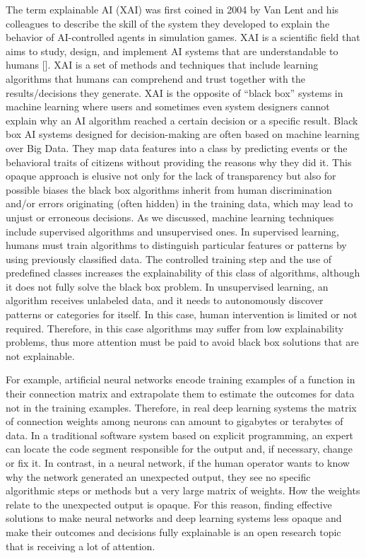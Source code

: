 The term explainable AI (XAI) was first coined in 2004 by Van Lent and his colleagues to describe the skill of the system they developed to explain the behavior of AI-controlled agents in simulation games. XAI is a scientific field that aims to study, design, and implement AI systems that are understandable to humans [\citealt{chap:10:AdadiandBerrada:2018}]. XAI is a set of methods and techniques that include learning algorithms that humans can comprehend and trust together with the results/{\allowbreak}decisions they generate. XAI is the opposite of ``black box'' systems in machine learning where users and sometimes even system designers cannot explain why an AI algorithm reached a certain decision or a specific result. Black box AI systems designed for decision-making are often based on machine learning over Big Data. They map data features into a class by predicting events or the behavioral traits of citizens without providing the reasons why they did it. This opaque approach is elusive not only for the lack of transparency but also for possible biases the black box algorithms inherit from human discrimination and/or errors originating (often hidden) in the training data, which may lead to unjust or erroneous decisions. As we discussed, machine learning techniques include supervised algorithms and unsupervised ones. In supervised learning, humans must train algorithms to distinguish particular features or patterns by using previously classified data. The controlled training step and the use of predefined classes increases the explainability of this class of algorithms, although it does not fully solve the black box problem. In unsupervised learning, an algorithm receives unlabeled data, and it needs to autonomously discover patterns or categories for itself. In this case, human intervention is limited or not required. Therefore, in this case algorithms may suffer from low explainability problems, thus more attention must be paid to avoid black box solutions that are not explainable.

For example, artificial neural networks encode training examples of a function in their connection matrix and extrapolate them to estimate the outcomes for data not in the training examples. Therefore, in real deep learning systems the matrix of connection weights among neurons can amount to gigabytes or terabytes of data. In a traditional software system based on explicit programming, an expert can locate the code segment responsible for the output and, if necessary, change or fix it. In contrast, in a neural network, if the human operator wants to know why the network generated an unexpected output, they see no specific algorithmic steps or methods but a very large matrix of weights. How the weights relate to the unexpected output is opaque. For this reason, finding effective solutions to make neural networks and deep learning systems less opaque and make their outcomes and decisions fully explainable is an open research topic that is receiving a lot of attention.


